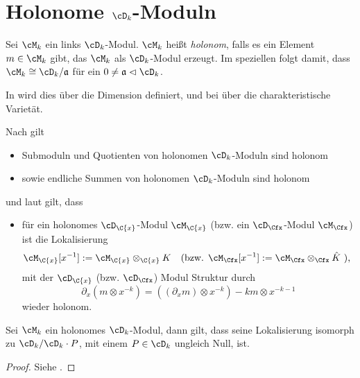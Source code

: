 \section{Holonome $\cD_k$-Moduln}
\begin{defn}
Sei $\cM_k$ ein links $\cD_k$-Modul. $\cM_k$ heißt \emph{holonom}, falls es ein
Element $m\in\cM_k$ gibt, das $\cM_k$ als $\cD_k$-Modul erzeugt. Im speziellen
folgt damit, dass $\cM_k\cong \cD_k/\mathfrak{a}$ für ein
$0\neq\mathfrak{a}\vartriangleleft\cD_k$.
\end{defn}
\begin{bem}
In \cite{coutinho1995primer} wird dies über die Dimension definiert, und bei
\cite{sabbah_cimpa90} über die charakteristische Varietät.
\end{bem}

\begin{bem} 
Nach \cite[Prop 10.1.1]{coutinho1995primer} gilt
\begin{itemize}
\item Submoduln und Quotienten von holonomen $\cD_k$-Moduln sind holonom
\item sowie endliche Summen von holonomen $\cD_k$-Moduln sind holonom
\end{itemize}
und laut \cite[Thm. 4.2.3]{sabbah_cimpa90} gilt, dass
\begin{itemize}
\item für ein holonomes $\cD_{\C\{x\}}$-Modul $\cM_{\C\{x\}}$
(bzw. ein $\cD_{\Cfx}$-Modul $\cM_{\Cfx}$)
ist die Lokalisierung
\begin{align*}
\cM_{\C\{x\}}[x^{-1}]&:=\cM_{\C\{x\}}\otimes_{\C\{x\}}K
&&\text{(bzw. }\cM_{\Cfx}[x^{-1}]:=\cM_{\Cfx}\otimes_{\Cfx}\hat K\text{ ),}
\end{align*}
mit der $\cD_{\C\{x\}}$ (bzw. $\cD_{\Cfx}$) Modul Struktur durch
\[
\partial_x(m\otimes x^{-k})=((\partial_xm)\otimes x^{-k})-km\otimes x^{-k-1}
\]
wieder holonom.
\end{itemize}
\end{bem}

\begin{thm}
Sei $\cM_k$ ein holonomes $\cD_k$-Modul, dann gilt, dass seine Lokalisierung
isomorph zu $\cD_k/\cD_k\cdot P$, mit einem $P\in \cD_k$ ungleich Null, ist.
\end{thm}
\begin{proof}
Siehe \cite[Cor 4.2.8]{sabbah_cimpa90}.
\end{proof}

